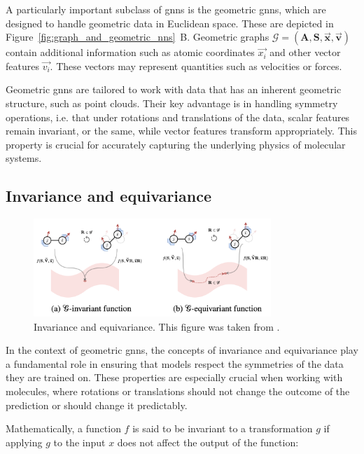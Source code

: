 A particularly important subclass of \acp{gnn} is the geometric \acp{gnn}, which are designed to handle geometric data in Euclidean space. These are depicted in Figure~\ref{fig:graph_and_geometric_nns}~B. Geometric graphs $\mathcal{G} = (\mathbf{A}, \mathbf{S}, \vec{\mathbf{x}}, \vec{\mathbf{v}})$ contain additional information such as atomic coordinates $\vec{x_i}$ and other vector features $\vec{v_i}$. These vectors may represent quantities such as velocities or forces.

Geometric \acp{gnn} are tailored to work with data that has an inherent geometric structure, such as point clouds. Their key advantage is in handling symmetry operations, i.e. that under rotations and translations of the data, scalar features remain invariant, or the same, while vector features transform appropriately. This property is crucial for accurately capturing the underlying physics of molecular systems.



\subsection{Invariance and equivariance}

\begin{figure}[t!]
    \centering
    \includegraphics[width=0.8\textwidth]{Figures/2_Theory/invariance_equivariance.png}
    \caption{Invariance and equivariance. This figure was taken from \citep{duvalHitchhikersGuideGeometric2024}.}
    \label{fig:invariance_equivariance}
\end{figure}

In the context of geometric \acp{gnn}, the concepts of invariance and equivariance play a fundamental role in ensuring that models respect the symmetries of the data they are trained on. These properties are especially crucial when working with molecules, where rotations or translations should not change the outcome of the prediction or should change it predictably.

Mathematically, a function $f$ is said to be invariant to a transformation $g$ if applying $g$ to the input $x$ does not affect the output of the function:

